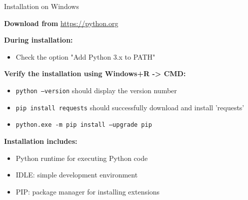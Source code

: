 \documentclass[
	11pt, 
]{beamer}
\begin{document}
\begin{frame}{Installation on Windows}

    \textbf{Download from} \url{https://python.org} \smallskip
    
    \textbf{During installation:}
    \begin{itemize}
        \item Check the option "Add Python 3.x to PATH"
    \end{itemize} \smallskip

    \textbf{Verify the installation using Windows+R -> CMD:}
    \begin{itemize}
        \item \texttt{python --version} should display the version number
        \item \texttt{pip install requests} should successfully download and install 'requests'
        \item \texttt{python.exe -m pip install --upgrade pip}
    \end{itemize} \smallskip

    \textbf{Installation includes:}
    \begin{itemize}
        \item Python runtime for executing Python code
        \item IDLE: simple development environment
        \item PIP: package manager for installing extensions
    \end{itemize}
\end{frame}

\end{document}
